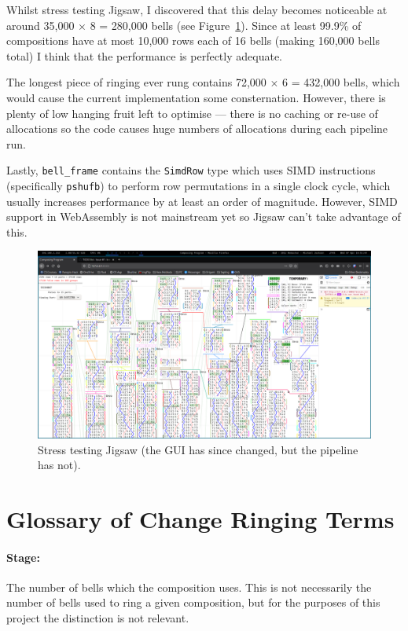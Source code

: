 \documentclass[12pt]{article}
\begin{document}
Whilst stress testing Jigsaw, I discovered that this delay becomes noticeable at around 35,000
$\times$ 8 = 280,000 bells (see Figure~\ref{fig:stress-test}).  Since at least 99.9\% of
compositions have at most 10,000 rows each of 16 bells (making 160,000 bells total) I think that the
performance is perfectly adequate.

The longest piece of ringing ever rung contains 72,000 $\times$ 6 = 432,000 bells, which would cause
the current implementation some consternation.  However, there is plenty of low hanging fruit left
to optimise --- there is no caching or re-use of allocations so the code causes huge numbers of
allocations during each pipeline run.

Lastly, \verb|bell_frame| contains the \verb|SimdRow| type which uses SIMD instructions
(specifically \verb|pshufb|) to perform row permutations in a single clock cycle, which usually
increases performance by at least an order of magnitude.  However, SIMD support in WebAssembly is
not mainstream yet so Jigsaw can't take advantage of this.

\begin{figure}
    \centering
    \includegraphics[width=\textwidth]{stress-test}
    \caption{Stress testing Jigsaw (the GUI has since changed, but the pipeline has
    not).}\label{fig:stress-test}
\end{figure}



\pagebreak

\section{Glossary of Change Ringing Terms}

\paragraph{Stage:} The number of bells which the composition uses.  This is not necessarily the
number of bells used to ring a given composition, but for the purposes of this project the
distinction is not relevant.
\end{document}
